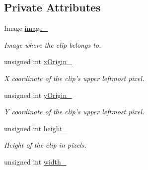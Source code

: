 \subsection*{Private Attributes}
\begin{CompactItemize}
\item 
\hypertarget{class_clip_69cbe1f1e045c2c758cec611c22372a8}{
Image \hyperlink{class_clip_69cbe1f1e045c2c758cec611c22372a8}{image\_\-}}
\label{class_clip_69cbe1f1e045c2c758cec611c22372a8}

\begin{CompactList}\small\item\em Image where the clip belongs to. \item\end{CompactList}\item 
\hypertarget{class_clip_e5aa310fe60185a19e2f3f8d4ba150e7}{
unsigned int \hyperlink{class_clip_e5aa310fe60185a19e2f3f8d4ba150e7}{xOrigin\_\-}}
\label{class_clip_e5aa310fe60185a19e2f3f8d4ba150e7}

\begin{CompactList}\small\item\em X coordinate of the clip's upper leftmost pixel. \item\end{CompactList}\item 
\hypertarget{class_clip_b7da9252cabfe96889e0676866799246}{
unsigned int \hyperlink{class_clip_b7da9252cabfe96889e0676866799246}{yOrigin\_\-}}
\label{class_clip_b7da9252cabfe96889e0676866799246}

\begin{CompactList}\small\item\em Y coordinate of the clip's upper leftmost pixel. \item\end{CompactList}\item 
\hypertarget{class_clip_eac813b06cee742c237240d9b7ccc336}{
unsigned int \hyperlink{class_clip_eac813b06cee742c237240d9b7ccc336}{height\_\-}}
\label{class_clip_eac813b06cee742c237240d9b7ccc336}

\begin{CompactList}\small\item\em Height of the clip in pixels. \item\end{CompactList}\item 
\hypertarget{class_clip_ba0048c33d63c40629e568d301f64f59}{
unsigned int \hyperlink{class_clip_ba0048c33d63c40629e568d301f64f59}{width\_\-}}
\label{class_clip_ba0048c33d63c40629e568d301f64f59}


\end{CompactItemize}
